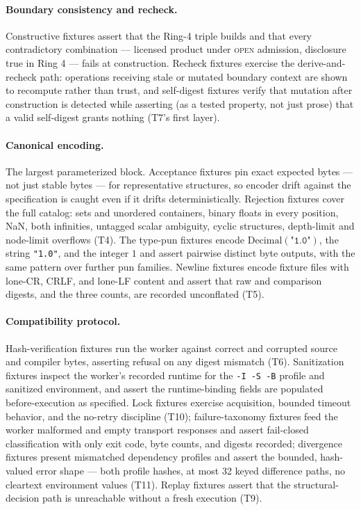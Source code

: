 \paragraph{Boundary consistency and recheck.} Constructive fixtures assert that the Ring-4 triple builds and that every contradictory combination --- licensed product under \textsc{open} admission, disclosure true in Ring 4 --- fails at construction. Recheck fixtures exercise the derive-and-recheck path: operations receiving stale or mutated boundary context are shown to recompute rather than trust, and self-digest fixtures verify that mutation after construction is detected while asserting (as a tested property, not just prose) that a valid self-digest grants nothing (T7's first layer).

\paragraph{Canonical encoding.} The largest parameterized block. Acceptance fixtures pin exact expected bytes --- not just stable bytes --- for representative structures, so encoder drift against the specification is caught even if it drifts deterministically. Rejection fixtures cover the full catalog: sets and unordered containers, binary floats in every position, NaN, both infinities, untagged scalar ambiguity, cyclic structures, depth-limit and node-limit overflows (T4). The type-pun fixtures encode $\mathrm{Decimal}(\texttt{"1.0"})$, the string \texttt{"1.0"}, and the integer $1$ and assert pairwise distinct byte outputs, with the same pattern over further pun families. Newline fixtures encode fixture files with lone-CR, CRLF, and lone-LF content and assert that raw and comparison digests, and the three counts, are recorded unconflated (T5).

\paragraph{Compatibility protocol.} Hash-verification fixtures run the worker against correct and corrupted source and compiler bytes, asserting refusal on any digest mismatch (T6). Sanitization fixtures inspect the worker's recorded runtime for the \texttt{-I -S -B} profile and sanitized environment, and assert the runtime-binding fields are populated before-execution as specified. Lock fixtures exercise acquisition, bounded timeout behavior, and the no-retry discipline (T10); failure-taxonomy fixtures feed the worker malformed and empty transport responses and assert fail-closed classification with only exit code, byte counts, and digests recorded; divergence fixtures present mismatched dependency profiles and assert the bounded, hash-valued error shape --- both profile hashes, at most 32 keyed difference paths, no cleartext environment values (T11). Replay fixtures assert that the structural-decision path is unreachable without a fresh execution (T9).

